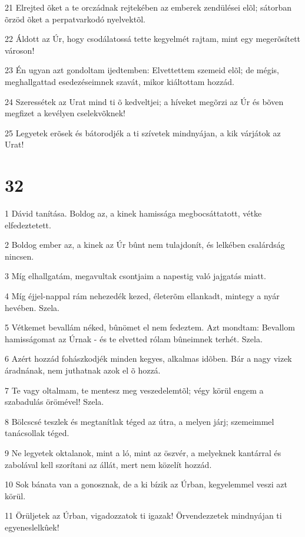 \par 21 Elrejted õket a te orczádnak rejtekében az emberek zendülései elõl; sátorban õrzöd õket a perpatvarkodó nyelvektõl.
\par 22 Áldott az Úr, hogy csodálatossá tette kegyelmét rajtam, mint egy megerõsített városon!
\par 23 Én ugyan azt gondoltam ijedtemben: Elvettettem szemeid elõl; de mégis, meghallgattad esedezéseimnek szavát, mikor kiáltottam hozzád.
\par 24 Szeressétek az Urat mind ti õ kedveltjei; a híveket megõrzi az Úr és bõven megfizet a kevélyen cselekvõknek!
\par 25 Legyetek erõsek és bátorodjék a ti szívetek mindnyájan, a kik várjátok az Urat!

\chapter{32}

\par 1 Dávid tanítása. Boldog az, a kinek hamissága megbocsáttatott, vétke elfedeztetett.
\par 2 Boldog ember az, a kinek az Úr bûnt nem tulajdonít, és lelkében csalárdság nincsen.
\par 3 Míg elhallgatám, megavultak csontjaim a napestig való jajgatás miatt.
\par 4 Míg éjjel-nappal rám nehezedék kezed, életerõm ellankadt, mintegy a nyár hevében. Szela.
\par 5 Vétkemet bevallám néked, bûnömet el nem fedeztem. Azt mondtam: Bevallom hamisságomat az Úrnak - és te elvetted rólam bûneimnek terhét. Szela.
\par 6 Azért hozzád fohászkodjék minden kegyes, alkalmas idõben. Bár a nagy vizek áradnának, nem juthatnak azok el õ hozzá.
\par 7 Te vagy oltalmam, te mentesz meg veszedelemtõl; végy körül engem a szabadulás örömével! Szela.
\par 8 Bölcscsé teszlek és megtanítlak téged az útra, a melyen járj; szemeimmel tanácsollak téged.
\par 9 Ne legyetek oktalanok, mint a ló, mint az öszvér, a melyeknek kantárral és zabolával kell szorítani az állát, mert nem közelít hozzád.
\par 10 Sok bánata van a gonosznak, de a ki bízik az Úrban, kegyelemmel veszi azt körül.
\par 11 Örüljetek az Úrban, vigadozzatok ti igazak! Örvendezzetek mindnyájan ti egyeneslelkûek!

